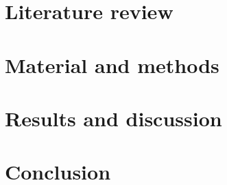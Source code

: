 





%
%
%
%
%
%
%
%
%
%
%
%
%
%
%

\chapter{Literature review}


\chapter{Material and methods}


\chapter{Results and discussion}


%

\chapter{Conclusion}


\clearpage


\printbibliography

\begin{appendices}

\end{appendices}


